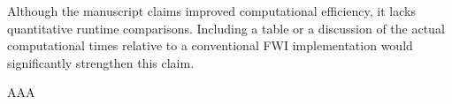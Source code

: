 \begin{point}
	Although the manuscript claims improved computational efficiency, it lacks quantitative runtime comparisons. Including a table or a discussion of the actual computational times relative to a conventional FWI implementation would significantly strengthen this claim.
\end{point}

\begin{reply}
	AAA
\end{reply}

